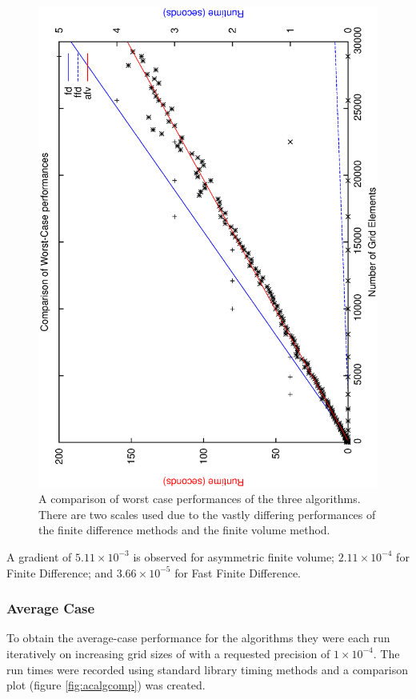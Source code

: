 \documentclass[aps,twocolumn,pre,nofootinbib,10pt]{revtex4-1}
\begin{document}
\begin{figure}
    \caption{A comparison of worst case performances of the three algorithms. There are two scales used due to the vastly differing performances of the finite difference methods and the finite volume method.}
    \label{fig:wcalgcomp}
    \includegraphics*[angle=-90,width = \columnwidth ]{comparison_wc.ps}
\end{figure}

A gradient of $5.11 \times 10^{-3}$ is observed for asymmetric finite volume; $2.11 \times 10^{-4}$ for Finite Difference; and $3.66 \times 10^{-5}$ for Fast Finite Difference.

\subsubsection{Average Case}

To obtain the average-case performance for the algorithms they were each run iteratively on increasing grid sizes of with a requested precision of $1 \times 10^{-4}$. The run times were recorded using standard library timing methods and a comparison plot (figure \ref{fig:acalgcomp}) was created.
\end{document}
